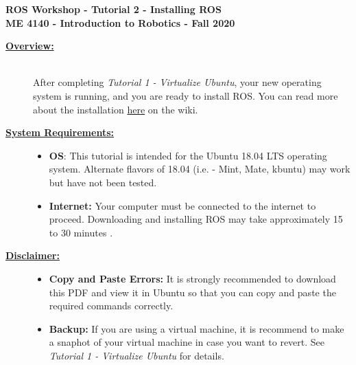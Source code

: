 \documentclass[12pt]{article}
\newcommand{\R}{\color{red}}
\begin{document}


\begin{center}
   {\bf \Large ROS Workshop - Tutorial 2 - Installing ROS}\vspace{3mm} \\
   {\bf \large ME 4140 - Introduction to Robotics - Fall 2020} \vspace{5mm}\\
\end{center}

\begin{description}

\item[\textbf{\underline{Overview:}}] \hfill \vspace{3mm}\\
After completing {\it Tutorial 1 - Virtualize Ubuntu}, your new operating system is running, and you are ready to install ROS. You can read more about the installation \href{http://wiki.ros.org/melodic/Installation/Ubuntu}{here} on the wiki.

\item[\textbf{\underline{System Requirements:}}] \hfill \vspace{0mm}

\begin{itemize}
	\item {\bf OS}: This tutorial is intended for the Ubuntu 18.04 LTS operating system. Alternate flavors of 18.04 (i.e. - Mint, Mate, kbuntu) may work but have not been tested.
	\item {\bf Internet:} Your computer must be connected to the internet to proceed. Downloading and installing ROS may take approximately 15 to 30 minutes .


\end{itemize}

\item[\textbf{\underline{Disclaimer:}}] \hfill \vspace{0mm}

\begin{itemize}
	\item {\bf\R Copy and Paste Errors:} {\R It is strongly recommended to download this PDF and view it in Ubuntu so that you can copy and paste the required commands correctly.}

	\item {\bf Backup: } If you are using a virtual machine, it is recommend to make a snaphot of your virtual machine in case you want to revert. See {\it Tutorial 1 - Virtualize Ubuntu } for details.   
\end{itemize}


\end{description}
\end{document}

